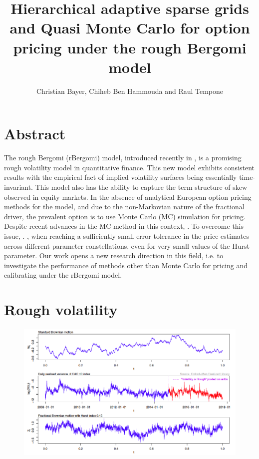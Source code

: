 \documentclass[ima, 20pt, portrait, plainboxedsections]{sciposter}
\title{Hierarchical adaptive sparse  grids and Quasi Monte Carlo for option pricing under the rough Bergomi model}
\author{Christian Bayer, Chiheb Ben Hammouda  and Raul Tempone}
\institute{King Abdullah University of Science and Technology (KAUST), Computer, Electrical and Mathematical Sciences \& Engineering Division (CEMSE), Saudi Arabia}
\begin{document}
\maketitle

\begin{multicols}{3}

\section*{Abstract} 
The rough Bergomi (rBergomi) model, introduced recently in  \cite{bayer2016pricing}, is a promising rough volatility model in quantitative finance. This new model exhibits consistent results with the empirical fact of implied volatility surfaces being essentially time-invariant. This model also has  the  ability to capture the term structure of skew observed in equity markets. In the absence of analytical European option pricing methods for the model, and due to the non-Markovian nature of the fractional driver, the prevalent option is to use Monte Carlo (MC) simulation for pricing. Despite recent advances in the MC method in this context, . To overcome this issue, . , when reaching a sufficiently small error tolerance in the price estimates across different parameter constellations, even for very small values of the Hurst  parameter. Our work opens a new research direction in this field, i.e. to investigate the performance of  methods  other than Monte Carlo for pricing and calibrating under the rBergomi model.
\section*{Rough volatility}
\begin{figure}[H]
 \begin{center}
\includegraphics[scale=0.75]{vol_rough}
 \end{center}
\end{figure}

\end{multicols}
\end{document}

